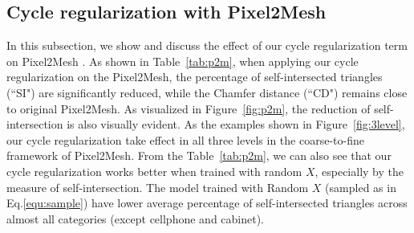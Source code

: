 \subsection{Cycle regularization with Pixel2Mesh}
In this subsection, we show and discuss the effect of our cycle regularization term on Pixel2Mesh \cite{pixel2mesh}. As shown in Table~\ref{tab:p2m}, when applying our cycle regularization on the Pixel2Mesh, the percentage of self-intersected triangles (``SI") are significantly reduced, while the Chamfer distance (``CD") remains close to original Pixel2Mesh. As visualized in Figure~\ref{fig:p2m}, the reduction of self-intersection is also visually evident. As the examples shown in Figure~\ref{fig:3level}, our cycle regularization take effect in all three levels in the coarse-to-fine framework of Pixel2Mesh.
From the Table~\ref{tab:p2m}, we can also see that our cycle regularization works better when trained with random $X$, especially by the measure of self-intersection. The model trained with Random $X$ (sampled as in Eq.\ref{equ:sample}) have lower average percentage of self-intersected triangles across almost all categories (except cellphone and cabinet).
